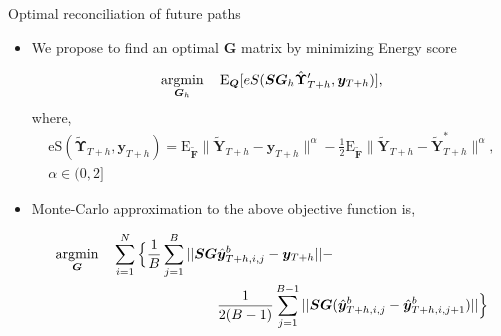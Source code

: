 \documentclass[11pt,xcolor=dvipsnames,handout]{beamer} %
\def\E{\text{E}}
\begin{document}
\begin{frame}{Optimal reconciliation of future paths}
\begin{itemize}[<+-| alert@+>]
	\item We propose to find an optimal $\bm{G}$ matrix by minimizing Energy score 
	
	\begin{equation*}
	\operatornamewithlimits{argmin}_{\bm{G}_h} \quad \E_{\bm{Q}}[eS(\bm{SG}_h\hat{\bm{\Upsilon}}'_{T+h}, \bm{y}_{T+h})],
	\end{equation*}
	where, \begin{align*}
	\text{eS}(\tilde{\bm{\Upsilon}}_{T+h},\bm{y}_{T+h}) = 
	\E_{\tilde{\bm{F}}}
	\|\tilde{\bm{Y}}_{T+h}-\bm{y}_{T+h}\|^\alpha -
	\frac{1}{2}\E_{\tilde{\bm{F}}}\|\tilde{\bm{Y}}_{T+h}-\tilde{\bm{Y}}^*_{T+h}\|^\alpha,\\ \alpha \in (0,2]
	\end{align*}
	\item Monte-Carlo approximation to the above objective function is, 
	
	\begin{block}{}
		\begin{align*}
		\operatornamewithlimits{argmin}_{\bm{G}} \quad \sum_{i=1}^{N}\Big\{\frac{1}{B}\sum_{j=1}^{B}||\bm{SG}&\hat{\bm{y}}_{T+h,i,j}^b -\bm{y}_{T+h}||-\\
		&\frac{1}{2(B-1)}\sum_{j=1}^{B-1}||\bm{SG}(\hat{\bm{y}}_{T+h,i,j}^b -\hat{\bm{y}}_{T+h,i,j+1}^b)||\Big\}
		\end{align*}
	\end{block}
\end{itemize}
\end{frame}
\end{document}
